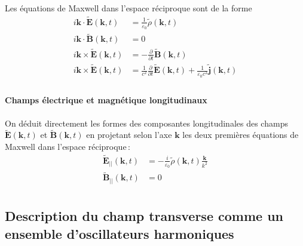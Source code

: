             Les équations de Maxwell dans l’espace réciproque sont de la forme 
            \begin{align*}
                i \mathbf{k} \cdot \tilde{\mathbf{E}}(\mathbf{k}, t) &= \frac{1}{\varepsilon_0} \tilde{\rho}(\mathbf{k}, t) \\
                i \mathbf{k} \cdot \tilde{\mathbf{B}}(\mathbf{k}, t) &= 0 \\
                i \mathbf{k} \times \tilde{\mathbf{E}}(\mathbf{k}, t) &= - \frac{\partial }{\partial t} \tilde{\mathbf{B}}(\mathbf{k}, t) \\
                i \mathbf{k} \times \tilde{\mathbf{E}}(\mathbf{k}, t) &= \frac{1}{c^2} \frac{\partial }{\partial t} \tilde{\mathbf{E}}(\mathbf{k}, t) + \frac{1}{\varepsilon_0 c^2} \tilde{\mathbf{j}}(\mathbf{k}, t) \\
            \end{align*}

            \paragraph{Champs électrique et magnétique longitudinaux}

            On déduit directement les formes des composantes longitudinales des champs $\tilde{\mathbf{E}}(\mathbf{k}, t)$ et $\tilde{\mathbf{B}}(\mathbf{k}, t) $ en projetant selon l’axe $\mathbf{k}$ les deux premières équations de Maxwell dans l’espace réciproque :
            \begin{align*}
                \tilde{\mathbf{E}}_{||}(\mathbf{k}, t) &= -\frac{i}{\varepsilon_0} \tilde{\rho}(\mathbf{k}, t) \frac{\mathbf{k}}{k^2} \\
                \tilde{\mathbf{B}}_{||}(\mathbf{k}, t) &= 0 \\
            \end{align*}
            

    \subsection{Description du champ transverse comme un ensemble d’oscillateurs harmoniques}

